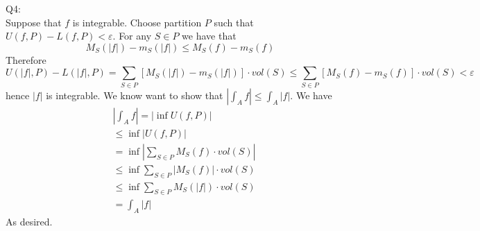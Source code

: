 \documentclass[letterpaper]{article}
\begin{document}
Q4:\\
Suppose that $f$ is integrable. Choose partition $P$ such that $U(f,P)-L(f,P)< \varepsilon$. For any $S\in P$ we have that $$M_S(|f|)-m_S(|f|) \leq M_S(f) - m_S(f)$$
Therefore $$U(|f|,P)-L(|f|,P) = \sum_{S\in P} [M_S(|f|)- m_S(|f|)] \cdot vol(S) \leq \sum_{S\in P}[M_S(f)-m_S(f)]\cdot vol(S) < \varepsilon$$ 
hence $|f|$ is integrable. We know want to show that $|\int_A f| \leq \int_A |f|$. We have 
\begin{align*}
    & |\int_A f| = |\inf U(f,P)| 
    \\ & \leq \inf |U(f,P)| \tag*{(from discussion in class)}
    \\ & = \inf |\sum_{S\in P} M_S(f)\cdot vol(S)|
    \\ & \leq \inf \sum_{S\in P} |M_S(f)|\cdot vol(S)
    \\ & \leq \inf \sum_{S\in P} M_S(|f|)\cdot vol(S)
    \\ & = \int_A |f|
\end{align*} As desired. 
\end{document}
